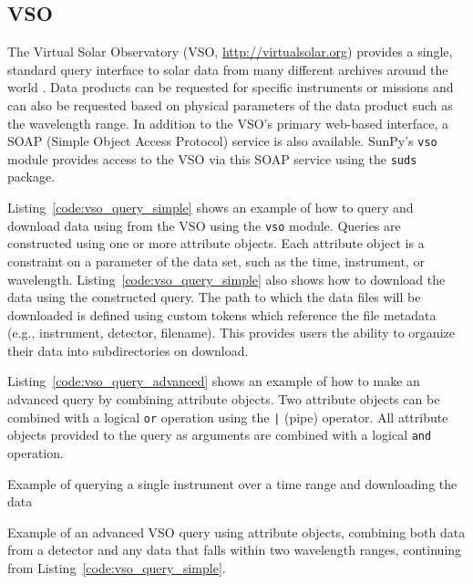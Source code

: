 \subsection{VSO}\label{ssec:vso}

The Virtual Solar Observatory (VSO, \url{http://virtualsolar.org}) provides a 
single, standard query interface to solar data from many different archives 
around the world \citep{hill2009}.
Data products can be requested for specific instruments or missions and
can also be requested based on physical parameters of the data product such
as the wavelength range.
In addition to the VSO's primary web-based interface, a SOAP (Simple Object 
Access Protocol) service is also available.
SunPy's \texttt{vso} module provides access to the VSO via this SOAP service using the
\texttt{suds} package.

Listing~\ref{code:vso_query_simple} shows an example of how to query and download data using
from the VSO using the \texttt{vso} module.
Queries are constructed using one or more attribute objects. Each
attribute object is a constraint on a parameter of the data set, such as the
time, instrument, or wavelength.
Listing~\ref{code:vso_query_simple} also shows how to download the data using
the constructed query. The path to which the data files will be downloaded is defined using custom tokens
which reference the file metadata (e.g., instrument, detector, filename). This provides
users the ability to organize their data into subdirectories on download.

Listing~\ref{code:vso_query_advanced} shows an example of how to make an advanced
query by combining attribute objects.
Two attribute objects can be combined with a logical \texttt{or} operation
using the \texttt{|} (pipe) operator.
All attribute objects provided to the query as arguments are combined with a 
logical \texttt{and} operation.

\begin{listing}[H]
\caption{Example of querying a single instrument over a time range and downloading the data}
\label{code:vso_query_simple}
\end{listing}

\begin{listing}[H]
\caption{Example of an advanced VSO query using attribute objects,
combining both data from a detector and any data that falls within two wavelength ranges,
continuing from Listing~\ref{code:vso_query_simple}.}
\label{code:vso_query_advanced}
\end{listing}
